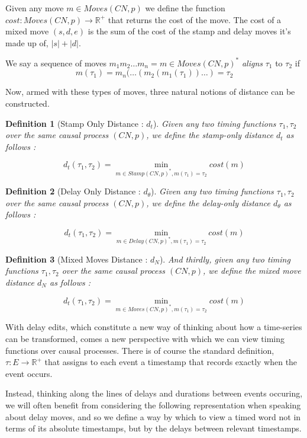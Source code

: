 \documentclass{article}
\theoremstyle{Definition}
\newtheorem{definition}{Definition}
\theoremstyle{definition}
\begin{document}
	Given any move $m \in Moves(CN, p)$ we define the function $cost : Moves(CN, p) \to \mathbb{R}^+$ that returns the cost of the move.  
	The cost of a mixed move $(s, d, e)$ is the sum of the cost of the stamp and delay moves it's made up of, $|s| + |d|$.
	
	We say a sequence of moves $m_1m_2\dots m_n = m \in Moves(CN, p)^*$ \textit{aligns} $\tau_1$ to $\tau_2$ if $$m(\tau_1) = m_n(\dots (m_2(m_1(\tau_1))\dots) = \tau_2$$

	Now, armed with these types of moves, three natural notions of distance can be constructed. 
	
	\begin{definition}[Stamp Only Distance : $d_t$]
		Given any two timing functions $\tau_1, \tau_2$ over the same causal process $(CN, p)$, we define the stamp-only distance $d_t$ as follows : 
		
		$$d_t(\tau_1, \tau_2) = \min_{m \in Stamp(CN, p)^*, m(\tau_1) = \tau_2} {cost(m)}$$
	\end{definition}

\begin{definition}[Delay Only Distance : $d_\theta$]
Given any two timing functions $\tau_1, \tau_2$ over the same causal process $(CN, p)$, we define the delay-only distance $d_\theta$ as follows : 

$$d_t(\tau_1, \tau_2) = \min_{m \in Delay(CN, p)^*, m(\tau_1) = \tau_2} {cost(m)}$$
\end{definition}

\begin{definition}[Mixed Moves Distance : $d_N$]
	And thirdly, given any two timing functions $\tau_1, \tau_2$ over the same causal process $(CN, p)$, we define the mixed move distance $d_N$ as follows : 
	
	$$d_t(\tau_1, \tau_2) = \min_{m \in Moves(CN, p)^*, m(\tau_1) = \tau_2} {cost(m)}$$
	\end{definition} 

	With delay edits, which constitute a new way of thinking about how a time-series can be transformed, comes a new perspective with which we can view timing functions over causal processes. 
	There is of course the standard definition, $\tau : E \to \mathbb{R}^+$ that assigns to each event a timestamp that records exactly when the event occurs. 
	
	Instead, thinking along the lines of delays and durations between events occuring, we will often benefit from considering the following representation when speaking about delay moves, and so we define a way by which to view a timed word not in terms of its absolute timestamps, but by the delays between relevant timestamps. 
	
\end{document}
